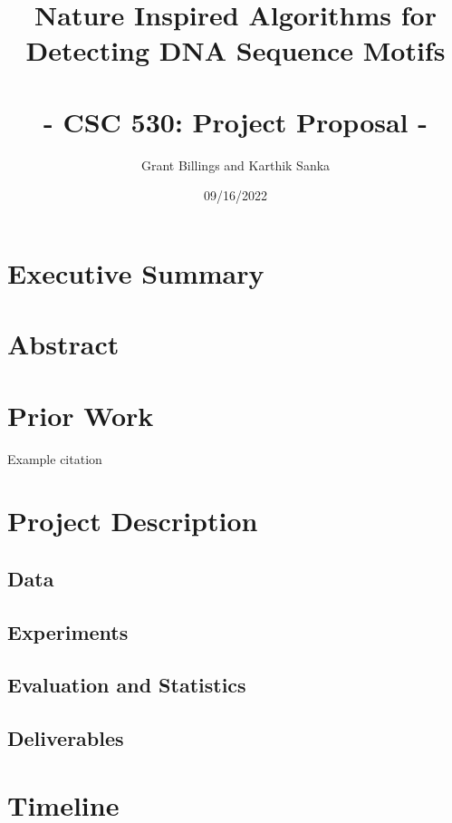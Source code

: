 \documentclass{article}
\title{%
	\Large Nature Inspired Algorithms for Detecting DNA Sequence Motifs \\
	\large \; \\ - CSC 530: Project Proposal -}
\author{Grant Billings and Karthik Sanka}
\date{09/16/2022}
\begin{document}
\maketitle
\section{Executive Summary}
\section{Abstract}
\section{Prior Work}
Example citation \cite{fister2013brief}
\section{Project Description}
\subsection{Data}
\subsection{Experiments}
\subsection{Evaluation and Statistics}
\subsection{Deliverables}
\section{Timeline}
\printbibliography
\end{document}
